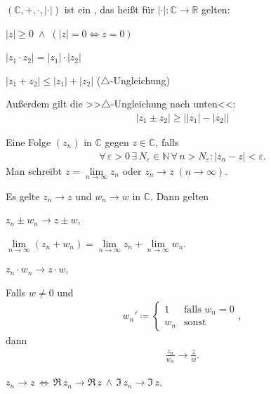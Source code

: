 \documentclass[a4paper,10pt]{scrbook}
\begin{document}
\begin{theorem}[Satz]
  $(\mathbb{C},+,\cdot,|\cdot|)$ ist ein , das heißt für $|\cdot| : \mathbb{C} \to \mathbb{R}$ gelten:
  \begin{enum-arab}
    \item $|z| \geq 0 \; \land \; (|z| = 0 \iff z = 0)$

    \item $|z_1 \cdot z_2| = |z_1| \cdot |z_2|$

    \item $|z_1 + z_2| \leq |z_1| + |z_2|$ ($\bigtriangleup$-Ungleichung)

    Außerdem gilt die >>$\bigtriangleup$-Ungleichung nach unten<<:
    \begin{align*}
      |z_1 \pm z_2| \geq \Big| |z_1| - |z_2| \Big|
    \end{align*}
  \end{enum-arab}
\end{theorem}

\begin{theorem}[Definition]
  Eine Folge $(z_n)$ in $\mathbb{C}$  gegen $z \in \mathbb{C}$, falls
  \begin{align*}
    \forall \, \varepsilon > 0 \, \exists \, N_\varepsilon \in \mathbb{N} \, \forall \, n > N_\varepsilon : |z_n - z| < \varepsilon.
  \end{align*}
  Man schreibt $z = \lim\limits_{n \to \infty} z_n$ oder $z_n \to z \; (n \to \infty)$.
\end{theorem}

\begin{theorem}[Satz] \label{thm:1.6}
  Es gelte $z_n \to z$ und $w_n \to w$ in $\mathbb{C}$. Dann gelten
  \begin{enum-arab}
    \item $z_n \pm w_n \to z \pm w$,

    $\lim\limits_{n \to \infty} (z_n + w_n) = \lim\limits_{n \to \infty} z_n + \lim\limits_{n \to \infty} w_n$.

    \item $z_n \cdot w_n \to z \cdot w$,

    \item Falls $w \neq 0$ und
    \begin{align*}
      w_n' \coloneq
      \begin{cases}
        1 & \text{falls } w_n = 0 \\
        w_n & \text{sonst}
      \end{cases},
    \end{align*}
    dann
    \begin{align*}
      \frac{z_n}{w_n} \to \frac{z}{w}.
    \end{align*}

    \item $z_n \to z \, \iff \, \Re\, z_n \to \Re\, z \, \land \, \Im\, z_n \to \Im\, z$.
  \end{enum-arab}
\end{theorem}
\end{document}
